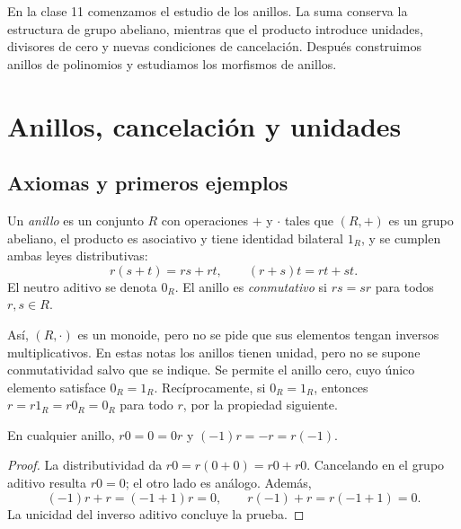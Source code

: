 En la clase 11 comenzamos el estudio de los anillos. La suma conserva la estructura de grupo abeliano, mientras que el producto introduce unidades, divisores de cero y nuevas condiciones de cancelación. Después construimos anillos de polinomios y estudiamos los morfismos de anillos.

\section{Anillos, cancelación y unidades}
\subsection{Axiomas y primeros ejemplos}
\begin{defi}
Un \emph{anillo} es un conjunto $R$ con operaciones $+$ y $\cdot$ tales que $(R,+)$ es un grupo abeliano, el producto es asociativo y tiene identidad bilateral $1_R$, y se cumplen ambas leyes distributivas:
\[
r(s+t)=rs+rt,\qquad (r+s)t=rt+st.
\]
El neutro aditivo se denota $0_R$. El anillo es \emph{conmutativo} si $rs=sr$ para todos $r,s\in R$.
\end{defi}
Así, $(R,\cdot)$ es un monoide, pero no se pide que sus elementos tengan inversos multiplicativos.
En estas notas los anillos tienen unidad, pero no se supone conmutatividad salvo que se indique. Se permite el anillo cero, cuyo único elemento satisface $0_R=1_R$. Recíprocamente, si $0_R=1_R$, entonces $r=r1_R=r0_R=0_R$ para todo $r$, por la propiedad siguiente.

\begin{lema}\label{lema:C11-cero}
En cualquier anillo, $r0=0=0r$ y $(-1)r=-r=r(-1)$.
\end{lema}
\begin{proof}
La distributividad da $r0=r(0+0)=r0+r0$. Cancelando en el grupo aditivo resulta $r0=0$; el otro lado es análogo. Además,
\[
(-1)r+r=(-1+1)r=0,\qquad r(-1)+r=r(-1+1)=0.
\]
La unicidad del inverso aditivo concluye la prueba.
\end{proof}


